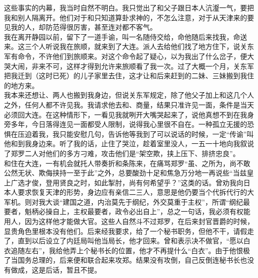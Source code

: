 这些事实的内幕，我当时自然不明白。我只觉出了和父子跟日本人沆瀣一气，要把我和别人隔离开。他们对于和只知道算卦求神的，不怎么注意，对于从天津来的要见我的人，却防范得很厉害，甚至连对都不客气。\\

我在离开静园以前，留下了一道手谕，叫一名随侍交给，命他随后来找我，命送来。这三个人听说我在旅顺，就来到了大连。派人去给他们找了地方住下，说关东军有命令，不许他们到旅顺来。对这个命令起了疑心，以为我出了什么岔子，便大哭大闹，非来不可，这样才得到允许来旅顺看了我一次。过了大概一个月，关东军把我迁到（这时已死）的儿子家里去住，这才让和后来赶到的二妹、三妹搬到我住的地方来。\\

我本来还想让、两人也搬到我身边，但说关东军规定，除了他父子加上和这几个人之外，任何人都不许见我。我请求他去和、商量，结果只准许见一面，条件是当天必须回大连。在这种情形下，一看见我就咧开大嘴哭起来了，说他真想不到在我身旁多年，今日落得连见一面都受人限制，说得我心里很不自在。一种孤立无援的恐惧在压迫着我，我只能安慰几句，告诉他等我到了可以说话的时候，一定“传谕”叫他和到我身边来。听了我的话，止住了哭泣，趁着室里没人，一五一十地向我叙说了郑罗二人对他们的多方刁难，攻击他们是“架空欺，挟上压下、排挤忠良”。\\

和住在大连，一有机会就托人带奏折和条陈来，在痛骂郑罗“虽、之所为，尚不敢公然无状、欺侮挟持一至于此”之外，总要酸劲十足和焦急万分地一再说些“当兹皇上广选才俊，登用贤良之时，如此掣肘，尚有何希望乎？”这类的话。曾劝我向日本人要求恢复天津的形势，身边应有亲信二三人，意思是他仍要当个代拆代行的大军机。则对我大谈“建国之道，内治莫先于纲纪，外交莫重于主权”，所谓“纲纪最要者，魁柄必操自上，主权最要者，政令必出自上”，总之一句话，我必须有权能用人，因为这样他才能做大官。这些人自然斗不过郑罗，在后来封官晋爵的时候，显贵角色里根本没有他们。后来经我要求，给了一个秘书职务，但他不干，请假走了，直到以后设立了内廷局叫他当局长，他才回来。曾和表示决不做官，“愿以白衣追随左右”，我给他弄上个秘书长的位置，他才不再提什么“白衣”。由于他恨极了当国务总理的，后来便和联合起来攻郑。结果没有攻倒，自己反倒连秘书长也没有做成，这是后话，暂且不提。\\

